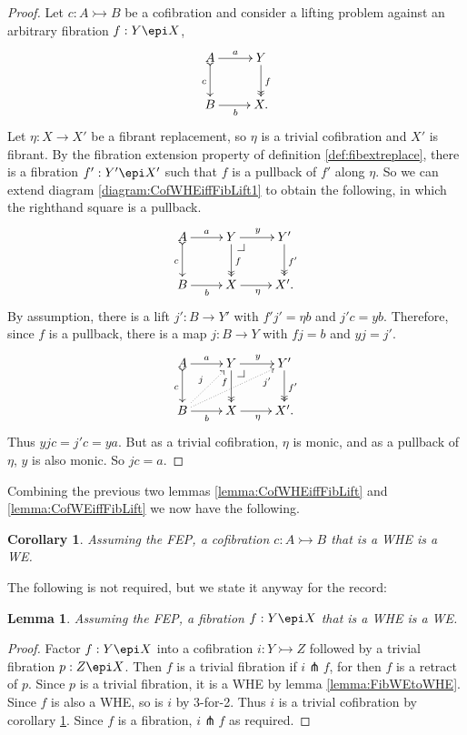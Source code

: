 \documentclass[12pt]{article}
\makeatletter
\newcommand{\pbcorner}[1][dr]{\save*!/#1-1.2pc/#1:(-1,1)@^{|-}\restore}
\newcommand{\mono}{\ensuremath{\rightarrowtail}}
\newcommand{\ra}{\ensuremath{\rightarrow}}
\newtheorem{lemma}[theorem]{Lemma}
\newtheorem{corollary}[theorem]{Corollary}
\theoremstyle{remark}
\theoremstyle{definition}
\makeatother
\begin{document}
\begin{proof}
Let $c : A\mono B$ be a cofibration and consider a lifting problem against an arbitrary fibration $f: Y\epi X$,
\begin{equation}\label{diagram:CofWHEiffFibLift1}
\xymatrix{
A \ar@{>->}[d]_{c} \ar[r]^-{a}  & Y \ar@{>>}[d]^{f} \\
B \ar[r]_{b} &  X.
}
\end{equation}
Let $\eta: X\ra X'$ be a fibrant replacement, so $\eta$ is a trivial cofibration and $X'$ is fibrant. 
By the fibration extension property of definition \ref{def:fibextreplace}, there is a fibration $f' : Y' \epi X'$ such that $f$ is a pullback of $f'$ along $\eta$. So we can extend diagram \eqref{diagram:CofWHEiffFibLift1} to obtain the following, in which the righthand square is a pullback.
\begin{equation}\label{diagram:CofWHEiffFibLift2}
\xymatrix{
A \ar@{>->}[d]_{c} \ar[r]^-{a}  & Y \ar@{>>}[d]^{f} {\pbcorner} \ar[r]^{y} & Y' \ar@{>>}[d]^{f'} \\
B \ar[r]_{b} &  X  \ar[r]_\eta &  X'.
}
\end{equation}
By assumption, there is a lift $j' : B\ra Y'$ with $f' j' = \eta b$ and $j'c = yb$.  Therefore, since $f$ is a pullback, there is a map $j : B\ra Y$ with $fj = b$ and $y j = j'$.  
\begin{equation}\label{diagram:CofWHEiffFibLift2}
\xymatrix{
A \ar@{>->}[d]_{c} \ar[r]^-{a}  & Y \ar@{>>}[d]_<<<<{f} {\pbcorner} \ar[r]^{y} & Y' \ar@{>>}[d]^{f'} \\
B \ar[r]_{b} \ar@{..>}[ru]^{j} \ar@{..>}[rru]_>>>>{j'} &  X  \ar[r]_\eta &  X'.
}
\end{equation}
Thus $yjc = j'c = ya$.  But as a trivial cofibration, $\eta$ is monic, and as a pullback of $\eta$, $y$ is also monic. So $jc=a$.
\end{proof}

Combining the previous two lemmas \ref{lemma:CofWHEiffFibLift} and \ref{lemma:CofWEiffFibLift} we now have the following.

\begin{corollary}\label{cor:CofWHEtoWE}
Assuming the FEP,  a cofibration $ c : A \mono B$ that is a WHE is a WE.
\end{corollary}

The following is not required, but we state it anyway for the record:

\begin{lemma}\label{lemma:FibWHEtoWE}
Assuming the FEP, a fibration $ f : Y \epi X$ that is a WHE is a WE.
\end{lemma}
\begin{proof}
Factor $ f : Y \epi X$ into a cofibration $i : Y\mono Z$ followed by a trivial fibration $p: Z\epi X$.  Then $f$ is a trivial fibration if $i\pitchfork f$, for then $f$ is a retract of $p$.  Since $p$ is a trivial fibration, it is a WHE by lemma \ref{lemma:FibWEtoWHE}.  Since $f$ is also a WHE, so is $i$ by 3-for-2.  Thus $i$ is a trivial cofibration by corollary \ref{cor:CofWHEtoWE}. Since $f$ is a fibration, $i\pitchfork f$ as required.
\end{proof}
\end{document}
